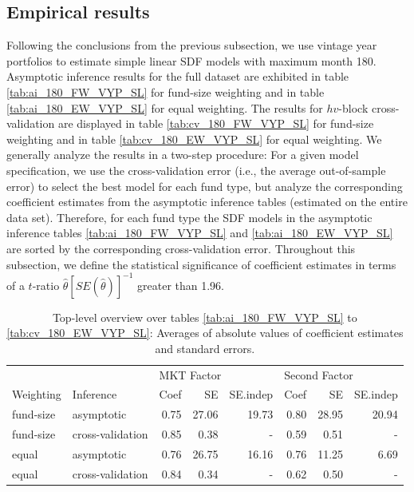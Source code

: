 \documentclass[12pt]{article}
\begin{document}
\subsection{Empirical results}

Following the conclusions from the previous subsection, we use vintage year portfolios to estimate simple linear SDF models with maximum month 180.
Asymptotic inference results for the full dataset are exhibited in table \ref{tab:ai_180_FW_VYP_SL} for fund-size weighting and in table \ref{tab:ai_180_EW_VYP_SL} for equal weighting.
The results for $hv$-block cross-validation are displayed in table \ref{tab:cv_180_FW_VYP_SL} for fund-size weighting and in table \ref{tab:cv_180_EW_VYP_SL} for equal weighting.
We generally analyze the results in a two-step procedure: For a given model specification, we use the cross-validation error (i.e., the average out-of-sample error) to select the best model for each fund type, but analyze the corresponding coefficient estimates from the asymptotic inference tables (estimated on the entire data set).
Therefore, for each fund type the SDF models in the asymptotic inference tables \ref{tab:ai_180_FW_VYP_SL} and \ref{tab:ai_180_EW_VYP_SL} are sorted by the corresponding cross-validation error.
Throughout this subsection, we define the statistical significance of coefficient estimates in terms of a $t$-ratio $\hat{\theta}[SE(\hat{\theta})]^{-1}$ greater than 1.96.

\begin{table}[ht]
	\centering
	\begin{tabular}{llrrrrrr}
		& & \multicolumn{3}{l}{MKT Factor} & \multicolumn{3}{l}{Second Factor} \\ 
		Weighting & Inference & Coef & SE & SE.indep & Coef & SE & SE.indep \\ 
		\hline
		\hline
		fund-size & asymptotic & 0.75 & 27.06 & 19.73 & 0.80 & 28.95 & 20.94 \\ 
		fund-size & cross-validation & 0.85 & 0.38 & - & 0.59 & 0.51 & - \\ 
		\hline
		equal & asymptotic & 0.76 & 26.75 & 16.16 & 0.76 & 11.25 & 6.69 \\ 
		equal & cross-validation & 0.84 & 0.34 & - & 0.62 & 0.50 & - \\ 
		\hline
		\hline
	\end{tabular}
	\caption{
		Top-level overview over tables \ref{tab:ai_180_FW_VYP_SL} to \ref{tab:cv_180_EW_VYP_SL}: 
		Averages of absolute values of coefficient estimates and standard errors.
	} 
	\label{tab:ai_sum_abs}
\end{table}
\end{document}
